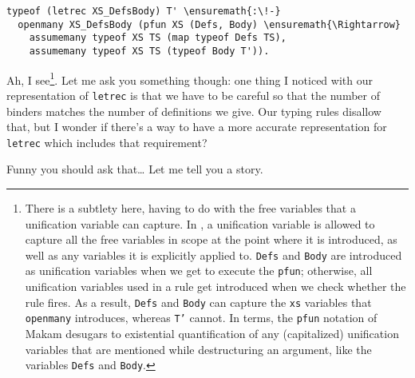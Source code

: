 \begin{verbatim}
typeof (letrec XS_DefsBody) T' \ensuremath{:\!-}
  openmany XS_DefsBody (pfun XS (Defs, Body) \ensuremath{\Rightarrow}
    assumemany typeof XS TS (map typeof Defs TS),
    assumemany typeof XS TS (typeof Body T')).
\end{verbatim}

\heroSTUDENT{} Ah, I
see\footnote{There is a subtlety here, having to do with the free variables that a unification variable
can capture. In \lamprolog, a unification variable is allowed to capture all the free variables in scope at the
point where it is introduced, as well as any variables it is explicitly applied to. \texttt{Defs} and \texttt{Body} are introduced as unification variables when we get to execute the \texttt{pfun}; otherwise, all unification variables used in a rule get introduced when we check whether the rule fires. As a result, \texttt{Defs} and \texttt{Body} can capture the \texttt{xs} variables that \texttt{openmany} introduces, whereas \texttt{T'} cannot. In \lamprolog terms, the \texttt{pfun} notation of Makam desugars to existential quantification of any (capitalized) unification variables that are mentioned while destructuring an argument, like the variables \texttt{Defs} and \texttt{Body}.}.
Let me ask you something though: one thing I noticed with our
representation of \texttt{letrec} is that we have to be careful so that
the number of binders matches the number of definitions we give. Our
typing rules disallow that, but I wonder if there's a way to have a more
accurate representation for \texttt{letrec} which includes that
requirement?

\heroADVISOR{} Funny you should ask that\ldots{} Let me tell you a story.
